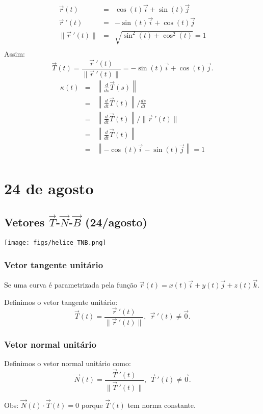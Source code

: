 \documentclass[a4paper,10pt]{book}
\begin{document}
\begin{eqnarray*}
\vec{r}(t)&=&\cos(t)\vec{i}+\sin(t)\vec{j} \\
\vec{r}~\!'(t)&=&-\sin(t)\vec{i}+\cos(t)\vec{j} \\
\|\vec{r}~\!'(t)\|&=&\sqrt{\sin^2(t)+\cos^2(t)}=1 \\
\end{eqnarray*}
Assim:
$$\vec{T}(t) = \frac{\vec{r}~\!'(t)}{\|\vec{r}~\!'(t)\|}=-\sin(t)\vec{i}+\cos(t)\vec{j}.$$
\begin{eqnarray*}
\kappa(t) &=& \left\|\frac{d}{ds}\vec{T}(s)\right\|\\
&=&\left\|\frac{d}{dt}\vec{T}(t)\right\|/ \frac{ds}{dt}\\
&=&\left\|\frac{d}{dt}\vec{T}(t)\right\|/ \|\vec{r}~\!'(t)\|\\
&=&\left\|\frac{d}{dt}\vec{T}(t)\right\|\\
&=&\left\|-\cos(t)\vec{i}-\sin(t)\vec{j}\right\|=1\\
\end{eqnarray*}


\chapter{24 de agosto}
\section{Vetores $\vec{T}$-$\vec{N}$-$\vec{B}$ (24/agosto)}
\begin{center}
 \texttt{[image: figs/helice\_TNB.png]}
 \end{center}

 \subsection{Vetor tangente unitário}
 Se uma curva é parametrizada pela função $\vec{r}(t)=x(t)\vec{i}+y(t)\vec{j}+z(t)\vec{k}$.
 
 Definimos o vetor tangente unitário:
 $$\vec{T}(t) = \frac{\vec{r}~\!'(t)}{\|\vec{r}~\!'(t)\|},~~\vec{r}~\!'(t)\neq \vec{0}.$$

 
 \subsection{Vetor normal unitário}
 Definimos o vetor normal unitário como:
 $$\vec{N}(t) = \frac{\vec{T}~\!'(t)}{\|\vec{T}~\!'(t)\|},~~\vec{T}~\!'(t)\neq \vec{0}.$$

  Obs: $\vec{N}(t)\cdot \vec{T}(t)=0$ porque $\vec{T}(t)$ tem norma constante. 
 
\end{document}
